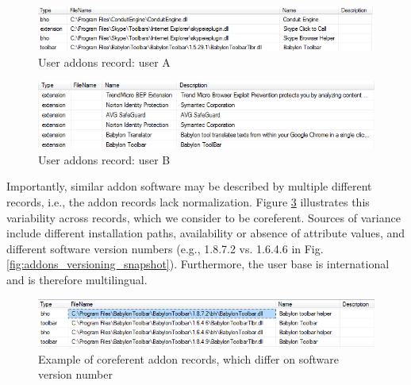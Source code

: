 \documentclass[ijoc,nonblindrev]{informs3} %
\numberwithin{equation}{subsection}
\begin{document}
\begin{figure}[t]
\centering
\begin{small}
\includegraphics[scale=.8,angle=0]{figures/db_addons_snapshot.png}
\end{small}
\caption{User addons record: user A}
\label{fig:db_addons_snapshot}
\end{figure}

\begin{figure}[t]
\centering
\begin{small}
\includegraphics[scale=.8,angle=0]{figures/db_addons_snapshot_desc.png}
\end{small}
\caption{User addons record: user B}
\label{fig:db_addons_snapshot_desc}
\end{figure}

Importantly, similar addon software may be described by multiple different records, i.e., the addon records lack normalization. Figure \ref{fig:addons_versioning_snapshot} illustrates this variability across records, which we consider to be coreferent. Sources of variance include different installation paths, availability or absence of attribute values, and different software version numbers (e.g., 1.8.7.2 vs. 1.6.4.6 in Fig. \autoref{fig:addons_versioning_snapshot}). Furthermore, the user base is international and is therefore multilingual. 

\begin{figure}[t]
\centering
\begin{small}
\includegraphics[scale=.8,angle=0]{figures/addons_versioning_snapshot.png}
\end{small}
\caption{Example of coreferent addon records, which differ on software version number}
\label{fig:addons_versioning_snapshot}
\end{figure}
\end{document}
